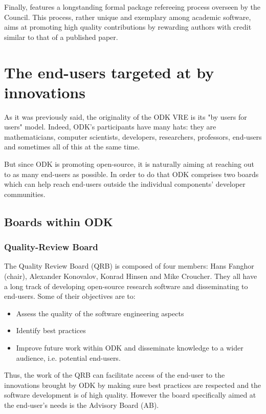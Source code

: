 \documentclass{deliverablereport}
\begin{document}
Finally, \GAP features a longstanding formal package refereeing process
overseen by the \GAP Council. This process, rather unique and exemplary
among academic software, aims at promoting high quality contributions
by rewarding authors with credit similar to that of a published paper.

\section{The end-users targeted at by innovations}


As it was previously said, the originality of the ODK VRE is its "by users for
users" model. Indeed, ODK's participants have many hats: they are
mathematicians, computer scientists, developers, researchers, professors,
end-users and sometimes all of this at the same time.

But since ODK is promoting open-source, it is naturally aiming at reaching out
to as many end-users as possible. In order to do that ODK comprises two boards
which can help reach end-users outside the individual components' developer
communities.

\subsection{Boards within ODK}

\subsubsection{Quality-Review Board}

The Quality Review Board (QRB) is composed of four members: Hans
Fanghor (chair), Alexander Konovalov, Konrad Hinsen and Mike
Croucher. They all have a long track of developing open-source research
software and disseminating to end-users. Some of their objectives are
to:

\begin{itemize}
\item{Assess the quality of the software engineering aspects}
\item{Identify best practices}
\item{Improve future work within ODK and disseminate knowledge to a wider audience, i.e. potential end-users.}
\end{itemize}

Thus, the work of the QRB can facilitate access of the end-user to the
innovations brought by ODK by making sure best practices are
respected and the software development is of high quality. However the
board specifically aimed at the end-user's needs is the Advisory
Board (AB).
\end{document}
